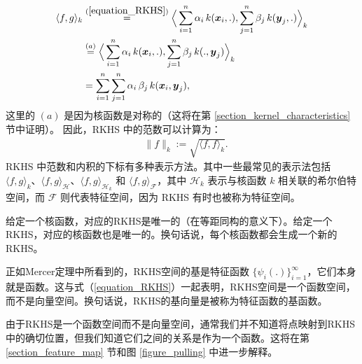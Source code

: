 \documentclass[lang=cn,10pt]{gorgeousnbook}
\numberwithin{equation}{section}%
\numberwithin{figure}{section}%
\begin{document}
\begin{align}
\langle f,g \rangle_k &\overset{(\ref{equation_RKHS})}{=} \Big\langle \sum_{i=1}^n \alpha_i\, k(\boldsymbol{x}_i, .), \sum_{j=1}^n \beta_j\, k(\boldsymbol{y}_j, .) \Big\rangle_k \nonumber \\
&\overset{(a)}{=} \Big\langle \sum_{i=1}^n \alpha_i\, k(\boldsymbol{x}_i, .), \sum_{j=1}^n \beta_j\, k(., \boldsymbol{y}_j) \Big\rangle_k \nonumber \\
&= \sum_{i=1}^n \sum_{j=1}^n \alpha_i\, \beta_j\, k(\boldsymbol{x}_i, \boldsymbol{y}_j), \label{equation_RKHS_inner_product}
\end{align}
这里的 $(a)$ 是因为核函数是对称的（这将在第 \ref{section_kernel_characteristics} 节中证明）。
因此，RKHS 中的范数可以计算为：
\begin{align}
&\|f\|_k := \sqrt{\langle f,f \rangle_k}.
\end{align}
RKHS 中范数和内积的下标有多种表示方法。其中一些最常见的表示法包括 $\langle f,g \rangle_k$、$\langle f,g \rangle_\mathcal{H}$、$\langle f,g \rangle_{\mathcal{H}_k}$ 和 $\langle f,g \rangle_\mathcal{F}$，其中 $\mathcal{H}_k$ 表示与核函数 $k$ 相关联的希尔伯特空间，而 $\mathcal{F}$ 则代表特征空间，因为 RKHS 有时也被称为特征空间。

\begin{remark}
给定一个核函数，对应的RKHS是唯一的（在等距同构的意义下）。给定一个RKHS，对应的核函数也是唯一的。换句话说，每个核函数都会生成一个新的RKHS。
\end{remark}

\begin{remark}
正如Mercer定理中所看到的，RKHS空间的基是特征函数 $\{\psi_i(.)\}_{i=1}^\infty$，它们本身就是函数。这与式（\ref{equation_RKHS}）一起表明，RKHS空间是一个函数空间，而不是向量空间。换句话说，RKHS的基向量是被称为特征函数的基函数。

由于RKHS是一个函数空间而不是向量空间，通常我们并不知道将点映射到RKHS中的确切位置，但我们知道它们之间的关系是作为一个函数。这将在第 \ref{section_feature_map} 节和图 \ref{figure_pulling} 中进一步解释。
\end{remark}
\end{document}
